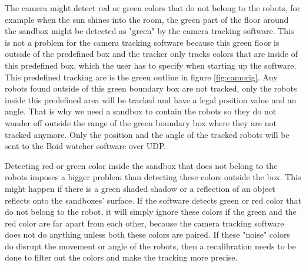 The camera might detect red or green colors that do not belong to the robots, for example when the sun shines into the room, the green part of the floor around the sandbox might be detected as "green" by the camera tracking software. This is not a problem for the camera tracking software because this green floor is outside of the predefined box and the tracker only tracks colors that are inside of this predefined box, which the user has to specify when starting up the software. This predefined tracking are is the green outline in figure \ref{fig:camorig}. Any robots found outside of this green boundary box are not tracked, only the robots inside this predefined area will be tracked and have a legal position value and an angle. That is why we need a sandbox to contain the robots so they do not wander off outside the range of the green boundary box where they are not tracked anymore. Only the position and the angle of the tracked robots will be sent to the Boid watcher software over UDP.

Detecting red or green color inside the sandbox that does not belong to the robots imposes a bigger problem than detecting these colors outside the box. This might happen if there is a green shaded shadow or a reflection of an object reflects onto the sandboxes' surface.
If the software detects green or red color that do not belong to the robot, it will simply ignore these colors if the green and the red color are far apart from each other, because the camera tracking software does not do anything unless both these colors are paired. If these "noise" colors do disrupt the movement or angle of the robots, then a recalibration needs to be done to filter out the colors and make the tracking more precise.

